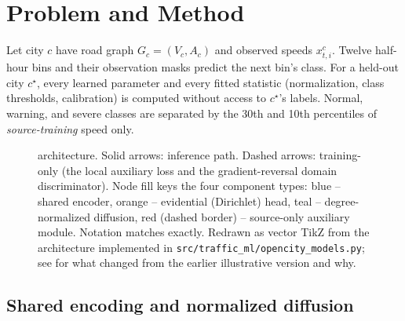 \section{Problem and Method}
\label{sec:method}

Let city $c$ have road graph $G_c=(V_c,A_c)$ and observed speeds $x^c_{t,i}$. Twelve half-hour bins
and their observation masks predict the next bin's class. For a held-out city $c^\star$, every
learned parameter and every fitted statistic (normalization, class thresholds, calibration) is
computed without access to $c^\star$'s labels. Normal, warning, and severe classes are separated by
the 30th and 10th percentiles of \emph{source-training} speed only.

\begin{figure}[t]
  \centering
  \resizebox{\linewidth}{!}{}
  \caption{\methodname{} architecture. Solid arrows: inference path. Dashed arrows: training-only
  (the local auxiliary loss and the gradient-reversal domain discriminator). Node fill keys the
  four component types: blue -- shared encoder, orange -- evidential (Dirichlet) head, teal --
  degree-normalized diffusion, red (dashed border) -- source-only auxiliary module. Notation
  matches 
  exactly. Redrawn as vector TikZ from the architecture implemented in
  \texttt{src/traffic\_ml/opencity\_models.py}; see  for what changed
  from the earlier illustrative version and why.}
  \label{fig:architecture}
\end{figure}

\subsection{Shared encoding and normalized diffusion}
\label{sec:method-diffusion}

